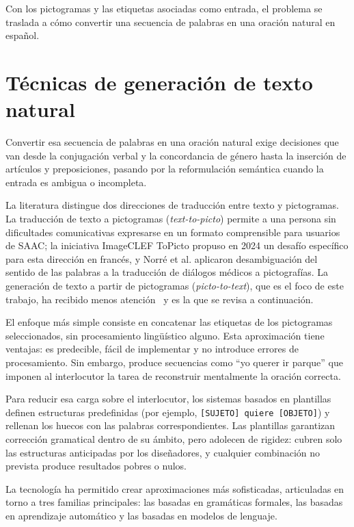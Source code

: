 Con los pictogramas y las etiquetas asociadas como entrada, el problema se traslada a cómo convertir una secuencia de palabras en una oración natural en español.

\section{Técnicas de generación de texto natural}

Convertir esa secuencia de palabras en una oración natural exige decisiones que van desde la conjugación verbal y la concordancia de género hasta la inserción de artículos y preposiciones, pasando por la reformulación semántica cuando la entrada es ambigua o incompleta.

La literatura distingue dos direcciones de traducción entre texto y pictogramas. La traducción de texto a pictogramas (\textit{text-to-picto}) permite a una persona sin dificultades comunicativas expresarse en un formato comprensible para usuarios de SAAC; la iniciativa ImageCLEF ToPicto propuso en 2024 un desafío específico para esta dirección en francés, y Norré et al. aplicaron desambiguación del sentido de las palabras a la traducción de diálogos médicos a pictografías. La generación de texto a partir de pictogramas (\textit{picto-to-text}), que es el foco de este trabajo, ha recibido menos atención~\cite{curtis2022stateofart} y es la que se revisa a continuación.

El enfoque más simple consiste en concatenar las etiquetas de los pictogramas seleccionados, sin procesamiento lingüístico alguno. Esta aproximación tiene ventajas: es predecible, fácil de implementar y no introduce errores de procesamiento. Sin embargo, produce secuencias como ``yo querer ir parque'' que imponen al interlocutor la tarea de reconstruir mentalmente la oración correcta.

Para reducir esa carga sobre el interlocutor, los sistemas basados en plantillas definen estructuras predefinidas (por ejemplo, \texttt{[SUJETO] quiere [OBJETO]}) y rellenan los huecos con las palabras correspondientes. Las plantillas garantizan corrección gramatical dentro de su ámbito, pero adolecen de rigidez: cubren solo las estructuras anticipadas por los diseñadores, y cualquier combinación no prevista produce resultados pobres o nulos.

La tecnología ha permitido crear aproximaciones más sofisticadas, articuladas en torno a tres familias principales: las basadas en gramáticas formales, las basadas en aprendizaje automático y las basadas en modelos de lenguaje.


